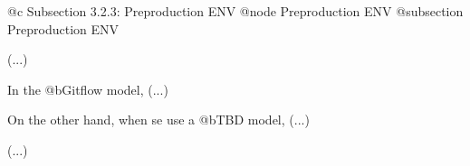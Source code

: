 @c Subsection 3.2.3: Preproduction ENV
@node Preproduction ENV
@subsection Preproduction ENV

(...)

In the @b{Gitflow} model, (...)

On the other hand, when se use a @b{TBD} model, (...)

(...)
